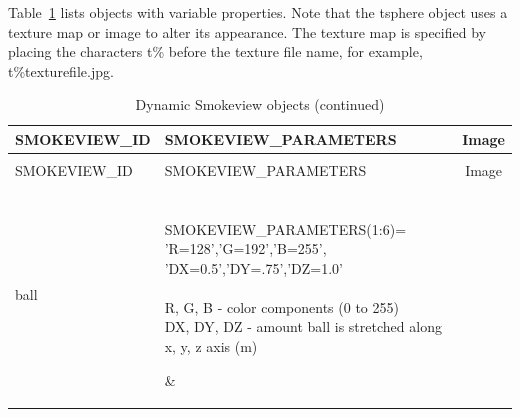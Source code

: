 Table~\ref{tab:devices_dynamic} lists objects with variable properties. Note that the {\ct tsphere} object uses a texture map or image to alter its appearance. The texture map is specified by placing the characters {\ct t\%} before the texture file name, for example, {\ct t\%texturefile.jpg}.

\begin{longtable}[ht]{|l|l|c|}
\caption{Dynamic Smokeview objects}
\label{tab:devices_dynamic}
\\ \hline
{\ct SMOKEVIEW\_ID}  & {\ct SMOKEVIEW\_PARAMETERS} & Image  \\ \hline \hline
\endfirsthead
\caption{Dynamic Smokeview objects (continued)}
\\ \hline
{\ct SMOKEVIEW\_ID}  & {\ct SMOKEVIEW\_PARAMETERS} & Image  \\ \hline \hline
\endhead

{\ct ball} &
\parbox[c]{\boxwidth}{
\hspace{1in} \\
{\ct SMOKEVIEW\_PARAMETERS(1:6)=}\\
{\ct 'R=128','G=192','B=255',}\\
{\ct 'DX=0.5','DY=.75','DZ=1.0'}\\  \\
{\ct R, G, B} - color components (0 to 255) \\
{\ct DX, DY, DZ} - amount ball is stretched along x, y, z axis (m) \\
\hspace{1in} } &
 \\ \hline

{\ct cone} &
\parbox[c]{\boxwidth}{
\hspace{1in} \\
{\ct SMOKEVIEW\_PARAMETERS(1:5)=}\\
{\ct 'R=128','G=255','B=192',}\\
{\ct 'D=0.4','H=0.6'}\\ \\
{\ct R, G, B} - color components (0 to 255) \\
{\ct D, H} - diameter and height (m) \\
\hspace{1in}
} &
 \\ \hline


\end{longtable}

